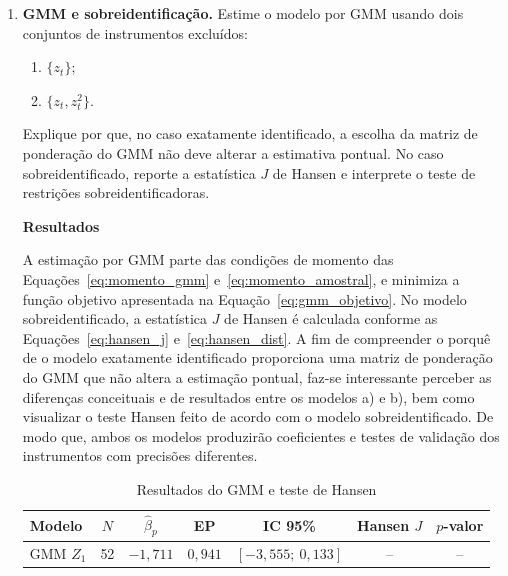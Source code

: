 \documentclass[12pt,a4paper]{article}
\begin{document}
\begin{enumerate}[label=\textbf{\arabic*.}]
    Portanto, o instrumento fraco reproduz estimativas enviesadas por 2SLS e induz a conclusões não confiáveis. Contudo, o parâmetro da nossa análise não seria suficiente caso o instrumento satisfizesse à condição de relevância. O procedimento teórico exige que a variável ateste à condição de exogeneidade, dada por $Corr(X_i,\varepsilon_i) = 0$. Em outras palavras, devemos nos certificar quais canais afetam a quantidade demanda. Pelo nosso exemplo prático, o preço do milho deve estar estritamente correlacionado com o preço do frango. Uma vez impactado por choques não observados, concentrados no termo de erro, a hipótese de exogeneidade é violada. Em particular, para um modelo exatamente identificado como esse, não há elementos metodológicos que possibilitem determinar objetivamente o pressuposto, dependendo de uma fundamentação contextual para sua aprovação.

\item \textbf{GMM e sobreidentificação.} Estime o modelo por GMM usando
    dois conjuntos de instrumentos excluídos:
    \begin{enumerate}[label=(\alph*)]
        \item $\{z_t\}$;
        \item $\{z_t, z_t^2\}$.
    \end{enumerate}
    Explique por que, no caso exatamente identificado, a escolha da matriz de
    ponderação do GMM não deve alterar a estimativa pontual. No caso
    sobreidentificado, reporte a estatística $J$ de Hansen e interprete o teste de
    restrições sobreidentificadoras.

\textbf{Resultados}

A estimação por GMM parte das condições de momento das Equações~\eqref{eq:momento_gmm} e~\eqref{eq:momento_amostral}, e minimiza a função objetivo apresentada na Equação~\eqref{eq:gmm_objetivo}. No modelo sobreidentificado, a estatística $J$ de Hansen é calculada conforme as Equações~\eqref{eq:hansen_j} e~\eqref{eq:hansen_dist}.
A fim de compreender o porquê de o modelo exatamente identificado proporciona uma matriz de ponderação do GMM que não altera a estimação pontual, faz-se interessante perceber as diferenças conceituais e de resultados entre os modelos a) e b), bem como visualizar o teste Hansen feito de acordo com o modelo sobreidentificado. De modo que, ambos os modelos produzirão coeficientes e testes de validação dos instrumentos com precisões diferentes.

\begin{table}[H]
    \centering
    \small
    \caption{Resultados do GMM e teste de Hansen}
    \label{tab:gmm_hansen}
    \setlength{\tabcolsep}{5pt}
    \begin{tabular}{lcccccc}
        \hline
        Modelo 
        & $N$ 
        & $\hat{\beta}_p$ 
        & EP 
        & IC 95\% 
        & Hansen $J$ 
        & $p$-valor \\
        \hline
        GMM $Z_1$ 
        & 52 
        & $-1{,}711$ 
        & $0{,}941$ 
        & $[-3{,}555;\ 0{,}133]$ 
        & -- 
        & -- \\


\end{tabular}
\end{table}
\end{enumerate}
\end{document}

